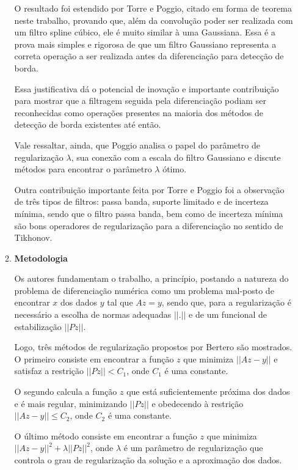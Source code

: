 \begin{enumerate}
\begin{enumerate}[label*=\arabic*.]
    O resultado foi estendido por Torre e Poggio, citado em forma de teorema neste trabalho, provando que, além da convolução poder ser realizada com um filtro spline cúbico, ele é muito similar à uma Gaussiana. Essa é a prova mais simples e rigorosa de que um filtro Gaussiano representa a correta operação a ser realizada antes da diferenciação para detecção de borda.
    
    Essa justificativa dá o potencial de inovação e importante contribuição para mostrar que a filtragem seguida pela diferenciação podiam ser reconhecidas como operações presentes na maioria dos métodos de detecção de borda existentes até então.
    
    Vale ressaltar, ainda, que Poggio \cite{Poggio1988106} analisa o papel do parâmetro de regularização $\lambda$, sua conexão com a escala do filtro Gaussiano e discute métodos para encontrar o parâmetro $\lambda$ ótimo.
    
    Outra contribuição importante feita por Torre e Poggio foi a observação de três tipos de filtros: passa banda, suporte limitado e de incerteza mínima, sendo que o filtro passa banda, bem como de incerteza mínima são bons operadores de regularização para a diferenciação no sentido de Tikhonov.
    \\[6pt]

    \item \textbf{Metodologia}
    
    Os autores fundamentam o trabalho, a princípio, postando a natureza do problema de diferenciação numérica como um problema mal-posto de encontrar $x$ dos dados $y$ tal que $Az = y$, sendo que, para a regularização é necessário a escolha de normas adequadas $||.||$ e de um funcional de estabilização $||Pz||$.
    
    Logo, três métodos de regularização propostos por Bertero são mostrados. O primeiro consiste em encontrar a função $z$ que minimiza $||Az - y||$ e satisfaz a restrição $||Pz|| < C_{1}$, onde $C_{1}$ é uma constante.
    
    O segundo calcula a função $z$ que está suficientemente próxima dos dados e é mais regular, minimizando $||Pz||$ e obedecendo à restrição $||Az - y|| \leq C_{2}$, onde $C_{2}$ é uma constante.
    
    O último método consiste em encontrar a função $z$ que minimiza $||Az - y||^2 + \lambda ||Pz||^2$, onde $\lambda$ é um parâmetro de regularização que controla o grau de regularização da solução e a aproximação dos dados.
    

\end{enumerate}
\end{enumerate}
